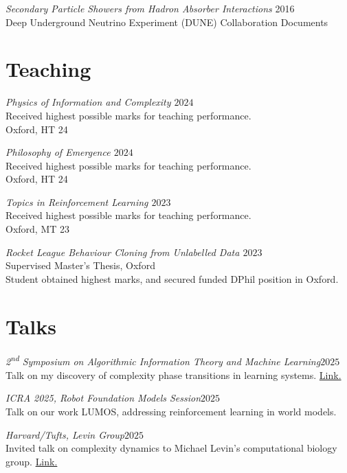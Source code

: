 \documentclass[margin]{res}
\begin{document}
\begin{resume}
                {\sl Secondary Particle Showers from Hadron Absorber Interactions} \hfill 2016 \\
                Deep Underground Neutrino Experiment (DUNE) Collaboration Documents


                \section{Teaching}
                        {\sl Physics of Information and Complexity \hfill $2024$}\\
                        Received highest possible marks for teaching performance.\\
                Oxford, HT 24

                {\sl Philosophy of Emergence \hfill $2024$}\\
                Received highest possible marks for teaching performance.\\
                Oxford, HT 24

                {\sl Topics in Reinforcement Learning \hfill $2023$}\\
                Received highest possible marks for teaching performance.\\
                Oxford, MT 23

                {\sl Rocket League Behaviour Cloning from Unlabelled Data \hfill $2023$}\\
                Supervised Master's Thesis, Oxford\\
                Student obtained highest marks, and secured funded DPhil position in Oxford.

                \section{Talks}
                {\sl 2\textsuperscript{nd} Symposium on Algorithmic Information Theory and Machine Learning\hfill $2025$}\\
                Talk on my discovery of complexity phase transitions in learning systems.
                \href{https://www.youtube.com/watch?v=6QjSH9ghUJs}{Link.}

                {\sl ICRA 2025, Robot Foundation Models Session\hfill $2025$}\\
                Talk on our work LUMOS, addressing reinforcement learning in world models.

                {\sl Harvard/Tufts, Levin Group\hfill $2025$}\\
                Invited talk on complexity dynamics to Michael Levin's computational biology group.
                \href{https://www.youtube.com/watch?v=gb0z8lV1i78}{Link.}


\end{resume}
\end{document}
